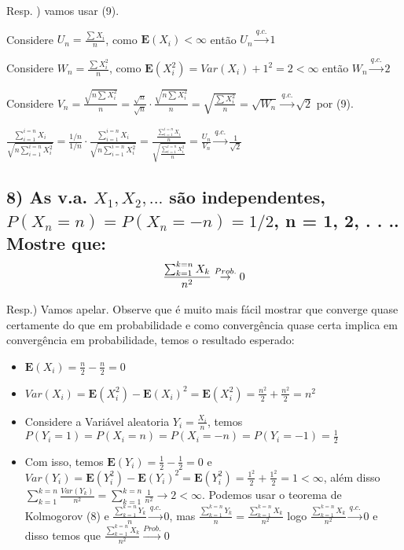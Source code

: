\documentclass[english]{article}
\begin{document}
Resp. ) vamos usar (9).

Considere $U_{n}=\frac{\sum X_{i}}{n}$, como $\mathbf{E}(X_{i})<\infty$
então $U_{n}\overset{q.c.}{\to}1$

Considere $W_{n}=\frac{\sum X_{i}^{2}}{n}$, como $\mathbf{E}(X_{i}^{2})=Var(X_{i})+1^{2}=2<\infty$
então $W_{n}\overset{q.c.}{\to}2$

Considere $V_{n}=\frac{\sqrt{n\sum X_{i}^{2}}}{n}=\frac{\sqrt{n}}{\sqrt{n}}\cdot\frac{\sqrt{n\sum X_{i}^{2}}}{n}=\sqrt{\frac{\sum X_{i}^{2}}{n}}=\sqrt{W_{n}}\overset{q.c.}{\to}\sqrt{2}$
por (9).

$\frac{\sum_{i=1}^{i=n}X_{i}}{\sqrt{n\sum_{i=1}^{i=n}X_{i}^{2}}}=\frac{1/n}{1/n}\cdot\frac{\sum_{i=1}^{i=n}X_{i}}{\sqrt{n\sum_{i=1}^{i=n}X_{i}^{2}}}=\frac{\frac{\sum_{i=1}^{i=n}X_{i}}{n}}{\sqrt{\frac{\sum_{i=1}^{i=n}X_{i}^{2}}{n}}}=\frac{U_{n}}{V_{n}}\overset{q.c.}{\to}\frac{1}{\sqrt{2}}$


\subsection*{\textcompwordmark{}}


\subsection*{\textmd{8) As v.a. $X_{1},X_{2},...$ são independentes, $P(X_{n}=n)=P(X_{n}=-n)=1/2$,
n = 1, 2, . . .. Mostre que:
\[
\frac{\sum_{k=1}^{k=n}X_{k}}{n^{2}}\protect\overset{Prob.}{\to}0
\]
}}

Resp.) Vamos apelar. Observe que é muito mais fácil mostrar que converge
quase certamente do que em probabilidade e como convergência quase
certa implica em convergência em probabilidade, temos o resultado
esperado:
\begin{itemize}
\item $\mathbf{E}(X_{i})=\frac{n}{2}-\frac{n}{2}=0$
\item \textbf{$Var(X_{i})=\mathbf{E}(X_{i}^{2})-\mathbf{E}(X_{i})^{2}=\mathbf{E}(X_{i}^{2})=\frac{n^{2}}{2}+\frac{n^{2}}{2}=n^{2}$}
\item Considere a Variável aleatoria $Y_{i}=\frac{X_{i}}{n}$, temos $P(Y_{i}=1)=P(X_{i}=n)=P(X_{i}=-n)=P(Y_{i}=-1)=\frac{1}{2}$
\item Com isso, temos $\mathbf{E}(Y_{i})=\frac{1}{2}-\frac{1}{2}=0$ e \textbf{$Var(Y_{i})=\mathbf{E}(Y_{i}^{2})-\mathbf{E}(Y_{i})^{2}=\mathbf{E}(Y_{i}^{2})=\frac{1^{2}}{2}+\frac{1^{2}}{2}=1<\infty$},
além disso $\sum_{k=1}^{k=n}\frac{Var(Y_{k})}{n^{2}}=\sum_{k=1}^{k=n}\frac{1}{n^{2}}\to2<\infty$.
Podemos usar o teorema de Kolmogorov (8) e $\frac{\sum_{k=1}^{k=n}Y_{k}}{n}\overset{q.c.}{\to}0$,
mas $\frac{\sum_{k=1}^{k=n}Y_{k}}{n}=\frac{\sum_{k=1}^{k=n}X_{k}}{n^{2}}$
logo $\frac{\sum_{k=1}^{k=n}X_{k}}{n^{2}}\overset{q.c.}{\to}0$ e
disso temos que $\frac{\sum_{k=1}^{k=n}X_{k}}{n^{2}}\overset{Prob.}{\to}0$
\end{itemize}
\end{document}
